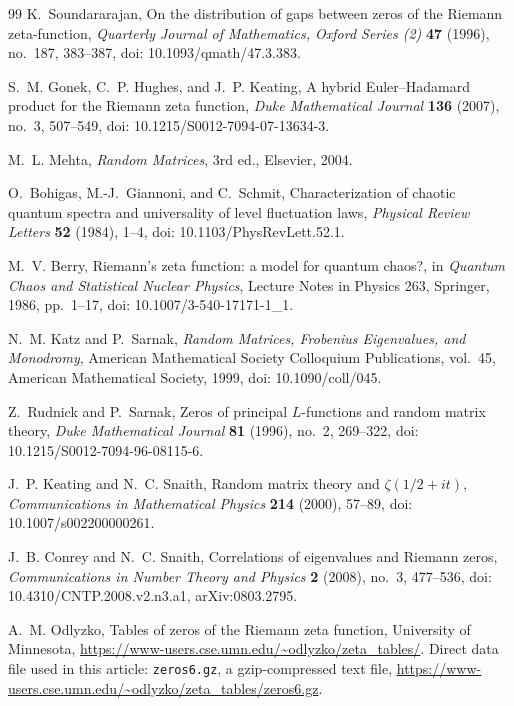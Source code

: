 \documentclass[12pt]{article}
\numberwithin{equation}{section}
\begin{document}
\begin{thebibliography}{99}
K.~Soundararajan,
On the distribution of gaps between zeros of the Riemann zeta-function,
\emph{Quarterly Journal of Mathematics, Oxford Series (2)} \textbf{47} (1996), no.~187, 383--387,
doi: 10.1093/qmath/47.3.383.

S.~M. Gonek, C.~P. Hughes, and J.~P. Keating,
A hybrid Euler--Hadamard product for the Riemann zeta function,
\emph{Duke Mathematical Journal} \textbf{136} (2007), no.~3, 507--549,
doi: 10.1215/S0012-7094-07-13634-3.

M.~L. Mehta,
\emph{Random Matrices},
3rd ed., Elsevier, 2004.

O.~Bohigas, M.-J.~Giannoni, and C.~Schmit,
Characterization of chaotic quantum spectra and universality of level fluctuation laws,
\emph{Physical Review Letters} \textbf{52} (1984), 1--4,
doi: 10.1103/PhysRevLett.52.1.

M.~V. Berry,
Riemann's zeta function: a model for quantum chaos?,
in \emph{Quantum Chaos and Statistical Nuclear Physics},
Lecture Notes in Physics 263,
Springer, 1986, pp.~1--17,
doi: 10.1007/3-540-17171-1\_1.

N.~M. Katz and P.~Sarnak,
\emph{Random Matrices, Frobenius Eigenvalues, and Monodromy},
American Mathematical Society Colloquium Publications, vol.~45,
American Mathematical Society, 1999,
doi: 10.1090/coll/045.

Z.~Rudnick and P.~Sarnak,
Zeros of principal \(L\)-functions and random matrix theory,
\emph{Duke Mathematical Journal} \textbf{81} (1996), no.~2, 269--322,
doi: 10.1215/S0012-7094-96-08115-6.

J.~P. Keating and N.~C. Snaith,
Random matrix theory and \(\zeta(1/2+it)\),
\emph{Communications in Mathematical Physics} \textbf{214} (2000), 57--89,
doi: 10.1007/s002200000261.

J.~B. Conrey and N.~C. Snaith,
Correlations of eigenvalues and Riemann zeros,
\emph{Communications in Number Theory and Physics} \textbf{2} (2008), no.~3, 477--536,
doi: 10.4310/CNTP.2008.v2.n3.a1,
arXiv:0803.2795.


A.~M. Odlyzko,
Tables of zeros of the Riemann zeta function,
University of Minnesota,
\url{https://www-users.cse.umn.edu/~odlyzko/zeta_tables/}.
Direct data file used in this article: \texttt{zeros6.gz}, a gzip-compressed text file,
\url{https://www-users.cse.umn.edu/~odlyzko/zeta_tables/zeros6.gz}.


\end{thebibliography}
\end{document}
